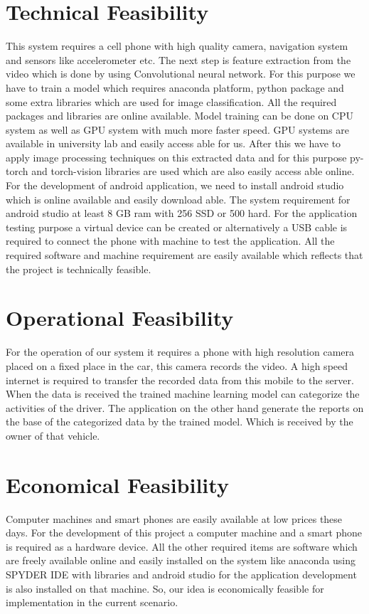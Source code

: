 \section{Technical Feasibility}
This system requires a cell phone with high quality camera, navigation system and sensors like
accelerometer etc. The next step is feature extraction from the video which is done by using
Convolutional neural network. For this purpose we have to train a model which requires anaconda
platform, python package and some extra libraries which are used for image classification. All the
required packages and libraries are online available. Model training can be done on CPU system as well
as GPU system with much more faster speed. GPU systems are available in university lab and easily
access able for us.
After this we have to apply image processing techniques on this extracted data and for this
purpose py-torch and torch-vision libraries are used which are also easily access able online.
For the development of android application, we need to install android studio which is online
available and easily download able. The system requirement for android studio at least 8 GB ram with
256 SSD or 500 hard. For the application testing purpose a virtual device can be created or alternatively
a USB cable is required to connect the phone with machine to test the application.
All the required software and machine requirement are easily available which reflects that the
project is technically feasible.

\section{Operational Feasibility}
For the operation of our system it requires a phone with high resolution camera placed on a
fixed place in the car, this camera records the video. A high speed internet is required to transfer the
recorded data from this mobile to the server. When the data is received the trained machine learning
model can categorize the activities of the driver.
The application on the other hand generate the reports on the base of the categorized data by the
trained model. Which is received by the owner of that vehicle.

\section{Economical Feasibility}
Computer machines and smart phones are easily available at low prices these days. For the
development of this project a computer machine and a smart phone is required as a hardware device.
All the other required items are software which are freely available online and easily installed on the
system like anaconda using SPYDER IDE with libraries and android studio for the application
development is also installed on that machine. So, our idea is economically feasible for implementation
in the current scenario.

